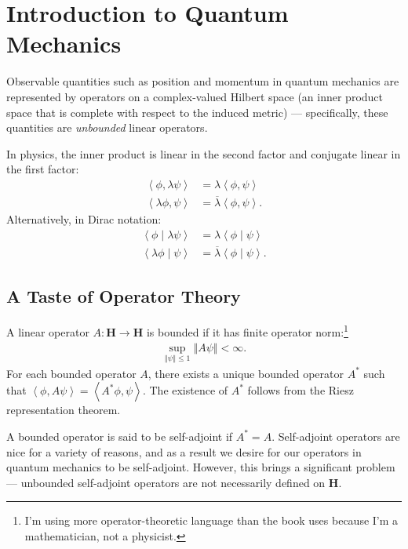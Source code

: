 \documentclass[10pt]{extarticle}
\newcommand{\braket}[2]{\left\langle#1\mid#2\right\rangle}
\newcommand{\iprod}[2]{\left\langle #1,#2\right\rangle}
\newcommand{\norm}[1]{\left\Vert #1\right\Vert}
\theoremstyle{plain}
\theoremstyle{definition}
\theoremstyle{remark}
\renewcommand{\newline}{\hfill\break}
\begin{document}
  \section{Introduction to Quantum Mechanics}%
  Observable quantities such as position and momentum in quantum mechanics are represented by operators on a complex-valued Hilbert space (an inner product space that is complete with respect to the induced metric) --- specifically, these quantities are \textit{unbounded} linear operators.\newline

  In physics, the inner product is linear in the second factor and conjugate linear in the first factor: 
  \begin{align*}
    \iprod{\phi}{\lambda \psi} &= \lambda\iprod{\phi}{\psi}\\
    \iprod{\lambda\phi}{\psi} &= \overline{\lambda}\iprod{\phi}{\psi}.
  \end{align*}
  Alternatively, in Dirac notation:
  \begin{align*}
    \braket{\phi}{\lambda \psi} &= \lambda \braket{\phi}{\psi}\\
    \braket{\lambda\phi}{\psi} &= \overline{\lambda}\braket{\phi}{\psi}.
  \end{align*}
  \subsection{A Taste of Operator Theory}%
  A linear operator $A: \mathbf{H} \rightarrow \mathbf{H}$ is bounded if it has finite operator norm:\footnote{I'm using more operator-theoretic language than the book uses because I'm  a mathematician, not a physicist.}
  \begin{align*}
    \sup_{\norm{\psi} \leq 1}\norm{A\psi} < \infty.
  \end{align*}
  For each bounded operator $A$, there exists a unique bounded operator $A^{\ast}$ such that $\iprod{\phi}{A\psi} = \iprod{A^{\ast}\phi}{\psi}$. The existence of $A^{\ast}$ follows from the Riesz representation theorem.\newline

  A bounded operator is said to be self-adjoint if $A^{\ast} = A$. Self-adjoint operators are nice for a variety of reasons, and as a result we desire for our operators in quantum mechanics to be self-adjoint. However, this brings a significant problem --- unbounded self-adjoint operators are not necessarily defined on $\mathbf{H}$.\newline
\end{document}
